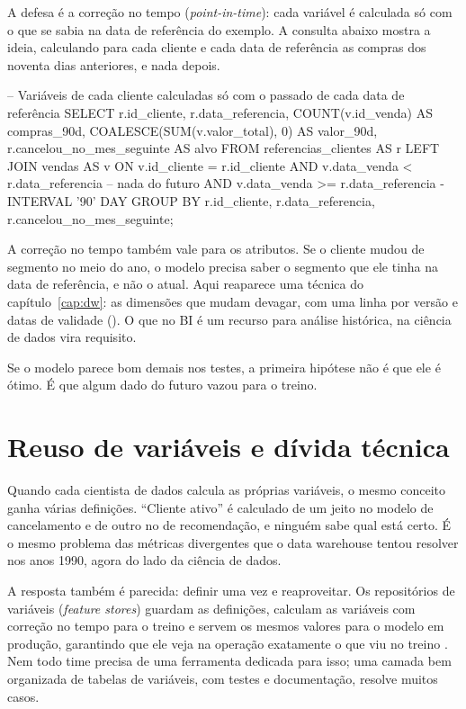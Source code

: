 A defesa é a correção no tempo (\emph{point-in-time}): cada variável é calculada só com o
que se sabia na data de referência do exemplo. A consulta abaixo mostra a ideia, calculando
para cada cliente e cada data de referência as compras dos noventa dias anteriores, e nada
depois.

\begin{sql}
-- Variáveis de cada cliente calculadas só com o passado de cada data de referência
SELECT
    r.id_cliente,
    r.data_referencia,
    COUNT(v.id_venda)                AS compras_90d,
    COALESCE(SUM(v.valor_total), 0)  AS valor_90d,
    r.cancelou_no_mes_seguinte       AS alvo
FROM referencias_clientes AS r
LEFT JOIN vendas AS v
       ON v.id_cliente = r.id_cliente
      AND v.data_venda <  r.data_referencia                       -- nada do futuro
      AND v.data_venda >= r.data_referencia - INTERVAL '90' DAY
GROUP BY r.id_cliente, r.data_referencia, r.cancelou_no_mes_seguinte;
\end{sql}

A correção no tempo também vale para os atributos. Se o cliente mudou de segmento no meio do
ano, o modelo precisa saber o segmento que ele tinha na data de referência, e não o atual.
Aqui reaparece uma técnica do capítulo~\ref{cap:dw}: as dimensões que mudam devagar, com
uma linha por versão e datas de validade (). O que no BI é um recurso para
análise histórica, na ciência de dados vira requisito.

\begin{destaque}
Se o modelo parece bom demais nos testes, a primeira hipótese não é que ele é ótimo. É que
algum dado do futuro vazou para o treino.
\end{destaque}

\section{Reuso de variáveis e dívida técnica}
\label{sec:feature-store}

Quando cada cientista de dados calcula as próprias variáveis, o mesmo conceito ganha várias
definições. \enquote{Cliente ativo} é calculado de um jeito no modelo de cancelamento e de
outro no de recomendação, e ninguém sabe qual está certo. É o mesmo problema das métricas
divergentes que o data warehouse tentou resolver nos anos 1990, agora do lado da ciência
de dados.

A resposta também é parecida: definir uma vez e reaproveitar. Os repositórios de variáveis
(\emph{feature stores}) guardam as definições, calculam as variáveis com correção no tempo
para o treino e servem os mesmos valores para o modelo em produção, garantindo que ele veja
na operação exatamente o que viu no treino \parencite{huyen2022}. Nem todo time precisa de
uma ferramenta dedicada para isso; uma camada bem organizada de tabelas de variáveis, com
testes e documentação, resolve muitos casos.

